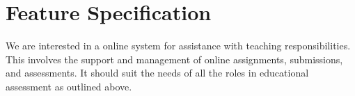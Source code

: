 
\chapter{Feature Specification}

We are interested in a online system for assistance with teaching
responsibilities. This involves the support and management of online
assignments, submissions, and assessments. It should suit the needs of all the
roles in educational assessment as outlined above.










